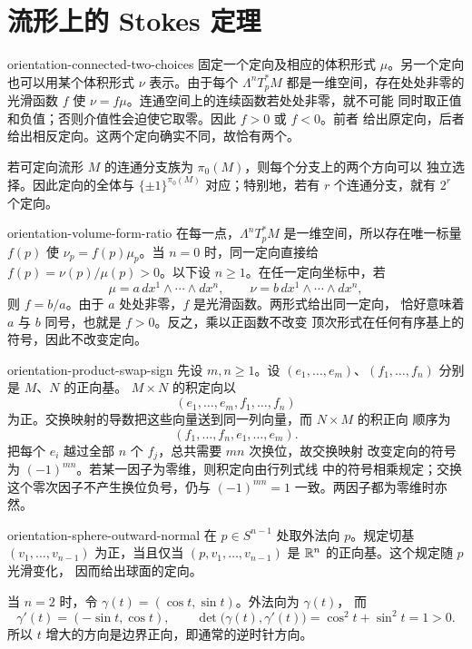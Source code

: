 \chapter{流形上的 Stokes 定理}

\begin{solution}{orientation-connected-two-choices}
固定一个定向及相应的体积形式 $\mu$。另一个定向也可以用某个体积形式
$\nu$ 表示。由于每个 $\Lambda^nT_p^*M$ 都是一维空间，存在处处非零的
光滑函数 $f$ 使 $\nu=f\mu$。连通空间上的连续函数若处处非零，就不可能
同时取正值和负值；否则介值性会迫使它取零。因此 $f>0$ 或 $f<0$。前者
给出原定向，后者给出相反定向。这两个定向确实不同，故恰有两个。

若可定向流形 $M$ 的连通分支族为 $\pi_0(M)$，则每个分支上的两个方向可以
独立选择。因此定向的全体与 $\{\pm1\}^{\pi_0(M)}$ 对应；特别地，若有
$r$ 个连通分支，就有 $2^r$ 个定向。
\end{solution}

\begin{solution}{orientation-volume-form-ratio}
在每一点，$\Lambda^nT_p^*M$ 是一维空间，所以存在唯一标量 $f(p)$ 使
$\nu_p=f(p)\mu_p$。当 $n=0$ 时，同一定向直接给
$f(p)=\nu(p)/\mu(p)>0$。以下设 $n\ge1$。在任一定向坐标中，若
\[
 \mu=a\,dx^1\wedge\cdots\wedge dx^n,\qquad
 \nu=b\,dx^1\wedge\cdots\wedge dx^n,
\]
则 $f=b/a$。由于 $a$ 处处非零，$f$ 是光滑函数。两形式给出同一定向，
恰好意味着 $a$ 与 $b$ 同号，也就是 $f>0$。反之，乘以正函数不改变
顶次形式在任何有序基上的符号，因此不改变定向。
\end{solution}

\begin{solution}{orientation-product-swap-sign}
先设 $m,n\ge1$。设 $(e_1,\ldots,e_m)$、$(f_1,\ldots,f_n)$ 分别是 $M$、$N$ 的正向基。
$M\times N$ 的积定向以
\[
 (e_1,\ldots,e_m,f_1,\ldots,f_n)
\]
为正。交换映射的导数把这些向量送到同一列向量，而 $N\times M$ 的积正向
顺序为
\[
 (f_1,\ldots,f_n,e_1,\ldots,e_m).
\]
把每个 $e_i$ 越过全部 $n$ 个 $f_j$，总共需要 $mn$ 次换位，故交换映射
改变定向的符号为 $(-1)^{mn}$。若某一因子为零维，则积定向由行列式线
中的符号相乘规定；交换这个零次因子不产生换位负号，仍与 $(-1)^{mn}=1$
一致。两因子都为零维时亦然。
\end{solution}

\begin{solution}{orientation-sphere-outward-normal}
在 $p\in S^{n-1}$ 处取外法向 $p$。规定切基
$(v_1,\ldots,v_{n-1})$ 为正，当且仅当
$(p,v_1,\ldots,v_{n-1})$ 是 $\mathbb{R}^n$ 的正向基。这个规定随 $p$ 光滑变化，
因而给出球面的定向。

当 $n=2$ 时，令 $\gamma(t)=(\cos t,\sin t)$。外法向为 $\gamma(t)$，
而
\[
 \gamma'(t)=(-\sin t,\cos t),\qquad
 \det\bigl(\gamma(t),\gamma'(t)\bigr)
 =\cos^2t+\sin^2t=1>0.
\]
所以 $t$ 增大的方向是边界正向，即通常的逆时针方向。
\end{solution}

